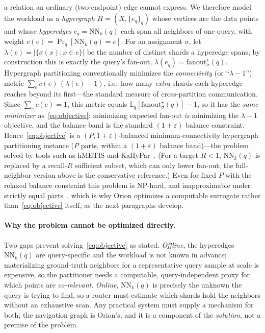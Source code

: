 a relation an ordinary (two-endpoint) edge cannot express. We therefore model the
workload as a \emph{hypergraph} $H=(X,\{e_q\}_q)$ whose vertices are the data
points and whose \emph{hyperedges} $e_q=\mathrm{NN}_k(q)$ each span all neighbors
of one query, with weight $c(e)=\Pr_q[\mathrm{NN}_k(q)=e]$. For an assignment
$\sigma$, let $\lambda(e)=|\{\sigma(x):x\in e\}|$ be the number of distinct shards
a hyperedge spans; by construction this is exactly the query's fan-out,
$\lambda(e_q)=\mathrm{fanout}^\star_\sigma(q)$. Hypergraph partitioning
conventionally minimizes the \emph{connectivity} (or ``$\lambda\!-\!1$'') metric
$\sum_e c(e)\,(\lambda(e)-1)$, i.e.\ how many \emph{extra} shards each hyperedge
reaches beyond its first---the standard measure of cross-partition communication.
Since $\sum_e c(e)=1$, this metric equals
$\mathbb{E}_q[\mathrm{fanout}^\star_\sigma(q)]-1$, so it has the \emph{same
minimizer} as~\eqref{eq:objective}: minimizing expected fan-out \emph{is}
minimizing the $\lambda\!-\!1$ objective, and the balance band is the standard
$(1{+}\varepsilon)$ balance constraint. Hence~\eqref{eq:objective} is a
$(P,1{+}\varepsilon)$-balanced minimum-connectivity hypergraph partitioning
instance ($P$ parts, within a $(1{+}\varepsilon)$ balance band)---the problem
solved by tools such as hMETIS and KaHyPar~\cite{metis,kahypar}. (For a target
$R<1$, $\mathrm{NN}_k(q)$ is replaced by a recall-$R$ sufficient subset, which can
only lower fan-out; the full-neighbor version above is the conservative
reference.) Even for fixed
$P$ with the relaxed balance constraint this problem is NP-hard, and
inapproximable under strictly equal parts~\cite{andreev2006}, which is why Orion
optimizes a computable surrogate rather than~\eqref{eq:objective} itself, as the
next paragraphs develop.

\paragraph{Why the problem cannot be optimized directly.}
Two gaps prevent solving~\eqref{eq:objective} as stated. \emph{Offline}, the
hyperedges $\mathrm{NN}_k(q)$ are query-specific and the workload is not known in
advance; materializing ground-truth neighbors for a representative query sample
at scale is expensive, so the partitioner needs a computable, query-independent
proxy for which points are \emph{co-relevant}. \emph{Online}, $\mathrm{NN}_k(q)$
is precisely the unknown the query is trying to find, so a router must estimate
which shards hold the neighbors without an exhaustive scan. Any practical system
must supply a mechanism for both; the navigation graph is Orion's, and it is a
component of the \emph{solution}, not a premise of the problem.

